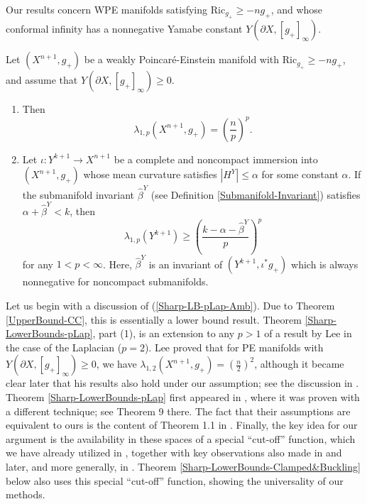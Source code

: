 \documentclass{amsart}
\newcommand{\Ric}{\text{Ric}}
\begin{document}
Our results concern WPE manifolds satisfying $\Ric_{g_+}\ge -ng_+$, and whose conformal infinity has a nonnegative Yamabe constant $Y(\partial X, [g_+]_\infty)$. 

\begin{theorem}\label{Sharp-LowerBounds-pLap}
   Let $(X^{n+1},g_+)$ be a weakly Poincar\'e-Einstein manifold with $\Ric_{g_+}\ge -ng_+$, and assume that $Y(\partial X, [g_+]_\infty)\ge 0$.  
   \begin{enumerate}
   \item Then 
   \begin{equation}\label{Sharp-LB-pLap-Amb}
   \lambda_{1,p}(X^{n+1},g_+) = \left(\frac{n}{p}\right)^p.
   \end{equation}
   \item Let $\iota: Y^{k+1}\to X^{n+1}$ be a complete and noncompact immersion into $(X^{n+1},g_+)$ whose mean curvature satisfies $|H^Y|\le \alpha$ for some constant $\alpha$. If the submanifold invariant $\hat \beta^Y$ (see Definition \ref{Submanifold-Invariant}) satisfies $\alpha+\hat \beta^Y< k$, then  
   \begin{equation}\label{Sharp-LB-pLap-Sub}
       \lambda_{1,p}(Y^{k+1})\ge \left(\frac{k-\alpha - \hat \beta^Y}{p}\right)^p
   \end{equation}
   for any $1<p<\infty$. Here, $\hat \beta^Y$ is an invariant of $(Y^{k+1},\iota^*g_+)$ which is always nonnegative for noncompact submanifolds. 
   \end{enumerate}
\end{theorem}

Let us begin with a discussion of (\ref{Sharp-LB-pLap-Amb}). Due to Theorem \ref{UpperBound-CC}, this is essentially a lower bound result. Theorem \ref{Sharp-LowerBounds-pLap}, part (1), is an extension to any $p>1$ of a result by Lee \cite{LeeJohnM.1995Tsoa} in the case of the Laplacian ($p=2$). Lee proved that for PE manifolds with $Y(\partial X,[g_+]_\infty)\ge 0$, we have $\lambda_{1,2}(X^{n+1},g_+) = \left(\frac{n}{2}\right)^2$, although it became clear later that his results also hold under our assumption; see the discussion in \cite{GuillarmouColin2010SCoP}. Theorem \ref{Sharp-LowerBounds-pLap} first appeared in \cite{HijaziOussama2020TCCo}, where it was proven with a different technique; see Theorem 9 there. The fact that their assumptions are equivalent to ours is the content of Theorem 1.1 in \cite{Perez-AyalaSamuel2025HaCc}. Finally, the key idea for our argument is the availability in these spaces of a special ``cut-off'' function, which we have already utilized in \cite{Perez-AyalaSamuel2025HaCc}, together with key observations also made in \cites{DuMao,LinHezi2025Sgef} and later, and more generally, in \cite{FarkasKajantoKristaly2025}. Theorem \ref{Sharp-LowerBounds-Clamped&Buckling} below also uses this special ``cut-off'' function, showing the universality of our methods.
\end{document}
